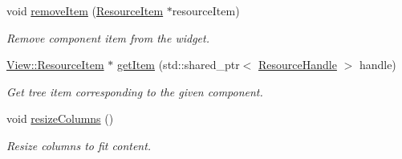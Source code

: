 \begin{Indent}
\begin{DoxyCompactItemize}
void \mbox{\hyperlink{classrev_1_1_view_1_1_resource_tree_widget_a8e2d79e22e92526fb7e25e2d75547b61}{remove\+Item}} (\mbox{\hyperlink{classrev_1_1_view_1_1_resource_item}{Resource\+Item}} $\ast$resource\+Item)
\begin{DoxyCompactList}\small\item\em Remove component item from the widget. \end{DoxyCompactList}\item 
\mbox{\label{classrev_1_1_view_1_1_resource_tree_widget_a6c17cbf1c043369e4ccf33acb2a97048}} 
\mbox{\hyperlink{classrev_1_1_view_1_1_resource_item}{View\+::\+Resource\+Item}} $\ast$ \mbox{\hyperlink{classrev_1_1_view_1_1_resource_tree_widget_a6c17cbf1c043369e4ccf33acb2a97048}{get\+Item}} (std\+::shared\+\_\+ptr$<$ \mbox{\hyperlink{classrev_1_1_resource_handle}{Resource\+Handle}} $>$ handle)
\begin{DoxyCompactList}\small\item\em Get tree item corresponding to the given component. \end{DoxyCompactList}\item 
\mbox{\label{classrev_1_1_view_1_1_resource_tree_widget_adffa4a345886d2cbb67f60155dcc26ca}} 
void \mbox{\hyperlink{classrev_1_1_view_1_1_resource_tree_widget_adffa4a345886d2cbb67f60155dcc26ca}{resize\+Columns}} ()
\begin{DoxyCompactList}\small\item\em Resize columns to fit content. \end{DoxyCompactList}\end{DoxyCompactItemize}
\end{Indent}
